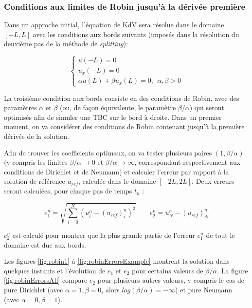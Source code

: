 \subsubsection{Conditions aux limites de Robin jusqu'à la dérivée première}

\indent Dans un approche initial, l'équation de KdV sera résolue dans le domaine $[-L,L]$ avec les conditions aux bords suivants (imposés dans la résolution du deuxième pas de la méthode de \emph{splitting}):

\begin{equation*}
\begin{cases}
    u(-L) = 0 \\
    u_x(-L) = 0 \\
    \alpha u(L) + \beta u_x(L) = 0,  \ \ \alpha,\beta > 0
\end{cases}
\end{equation*}

\indent La troisième condition aux bords consiste en des conditions de Robin, avec des paramètres $\alpha$ et $\beta$ (ou, de façon équivalente, le paramètre  $\beta/\alpha$) qui seront optimisés afin de simuler une TBC sur le bord à droite. Dans un premier moment, on va considérer des conditions de Robin contenant jusqu'à la première dérivée de la solution.

\indent Afin de trouver les coefficients optimaux, on va tester plusieurs paires $(1,\beta/\alpha)$ (y compris les limites $\beta/\alpha \rightarrow 0$ et $\beta/\alpha \rightarrow \infty$, correspondant respectivement aux conditions de Dirichlet et de Neumann) et calculer l'erreur par rapport à la solution de référence $u_{ref}$, calculée dans le domaine $[-2L,2L]$. Deux erreurs seront calculées, pour chaque pas de temps $t_n$ :

\begin{equation*}
e_1^n = \sqrt{\sum_{i=0}^N{\left( u^n_i - (u_{ref})^n_i\right)^2}} \qquad
e_2^n =  u^n_N - (u_{ref})^n_N
\end{equation*}

\indent $e_2^n$ est calculé pour montrer que la plus grande partie de l'erreur $e_1^n$ de tout le domaine est due aux bords.
 
\indent Les figures \ref{fig:robin1} à \ref{fig:robinErrorsExample} montrent la solution dans quelques instants et l'évolution de $e_1$ et $e_2$ pour certains valeurs de $\beta/\alpha$. La figure \ref{fig:robinErrorsAll} compare $e_2$  pour plusieurs autres valeurs, y compris le cas de pure Dirichlet  (avec $\alpha = 1, \beta = 0$, alors $log(\beta/\alpha) = -\infty$) et pure Neumann (avec $\alpha = 0, \beta = 1$).

